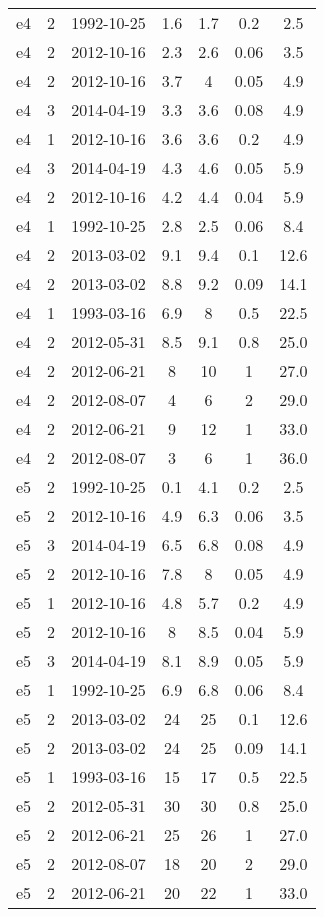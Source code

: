 \begin{table*}[htp]
\begin{tabular}{ccccccc}
e4 & 2 & 1992-10-25 & 1.6 & 1.7 & 0.2 & 2.5 \\
e4 & 2 & 2012-10-16 & 2.3 & 2.6 & 0.06 & 3.5 \\
e4 & 2 & 2012-10-16 & 3.7 & 4 & 0.05 & 4.9 \\
e4 & 3 & 2014-04-19 & 3.3 & 3.6 & 0.08 & 4.9 \\
e4 & 1 & 2012-10-16 & 3.6 & 3.6 & 0.2 & 4.9 \\
e4 & 3 & 2014-04-19 & 4.3 & 4.6 & 0.05 & 5.9 \\
e4 & 2 & 2012-10-16 & 4.2 & 4.4 & 0.04 & 5.9 \\
e4 & 1 & 1992-10-25 & 2.8 & 2.5 & 0.06 & 8.4 \\
e4 & 2 & 2013-03-02 & 9.1 & 9.4 & 0.1 & 12.6 \\
e4 & 2 & 2013-03-02 & 8.8 & 9.2 & 0.09 & 14.1 \\
e4 & 1 & 1993-03-16 & 6.9 & 8 & 0.5 & 22.5 \\
e4 & 2 & 2012-05-31 & 8.5 & 9.1 & 0.8 & 25.0 \\
e4 & 2 & 2012-06-21 & 8 & 10 & 1 & 27.0 \\
e4 & 2 & 2012-08-07 & 4 & 6 & 2 & 29.0 \\
e4 & 2 & 2012-06-21 & 9 & 12 & 1 & 33.0 \\
e4 & 2 & 2012-08-07 & 3 & 6 & 1 & 36.0 \\
e5 & 2 & 1992-10-25 & 0.1 & 4.1 & 0.2 & 2.5 \\
e5 & 2 & 2012-10-16 & 4.9 & 6.3 & 0.06 & 3.5 \\
e5 & 3 & 2014-04-19 & 6.5 & 6.8 & 0.08 & 4.9 \\
e5 & 2 & 2012-10-16 & 7.8 & 8 & 0.05 & 4.9 \\
e5 & 1 & 2012-10-16 & 4.8 & 5.7 & 0.2 & 4.9 \\
e5 & 2 & 2012-10-16 & 8 & 8.5 & 0.04 & 5.9 \\
e5 & 3 & 2014-04-19 & 8.1 & 8.9 & 0.05 & 5.9 \\
e5 & 1 & 1992-10-25 & 6.9 & 6.8 & 0.06 & 8.4 \\
e5 & 2 & 2013-03-02 & 24 & 25 & 0.1 & 12.6 \\
e5 & 2 & 2013-03-02 & 24 & 25 & 0.09 & 14.1 \\
e5 & 1 & 1993-03-16 & 15 & 17 & 0.5 & 22.5 \\
e5 & 2 & 2012-05-31 & 30 & 30 & 0.8 & 25.0 \\
e5 & 2 & 2012-06-21 & 25 & 26 & 1 & 27.0 \\
e5 & 2 & 2012-08-07 & 18 & 20 & 2 & 29.0 \\
e5 & 2 & 2012-06-21 & 20 & 22 & 1 & 33.0 \\

\end{tabular}
\end{table*}
